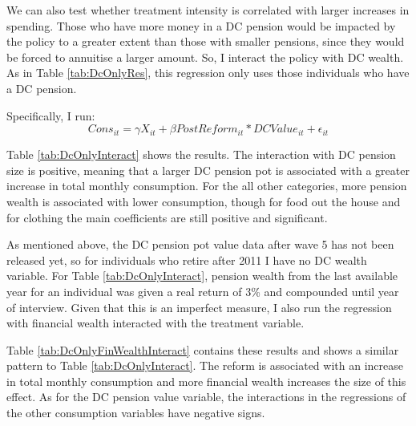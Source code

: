 \documentclass[12pt]{article}
\begin{document}
We can also test whether treatment intensity is correlated with larger increases
in spending. Those who have more money in a DC pension would be impacted by the
policy to a greater extent than those with smaller pensions, since they would be
forced to annuitise a larger amount. So, I interact the policy with DC wealth.
As in Table \ref{tab:DcOnlyRes}, this regression only uses those individuals who
have a DC pension.

Specifically, I run:
\begin{equation*}
    Cons_{it} =  \gamma X_{it} + \beta PostReform_{it}*DCValue_{it} + \epsilon_{it}
\end{equation*}

Table \ref{tab:DcOnlyInteract} shows the results. The interaction with DC
pension size is positive, meaning that a larger DC pension pot is associated with a
greater increase in total monthly consumption. For the all other categories,
more pension wealth is associated with lower consumption, though for food out
the house and for clothing the main coefficients are still positive and
significant.

As mentioned above, the DC pension pot value data after
wave 5 has not been released yet, so for individuals who retire after 2011 I
have no DC wealth variable. For Table \ref{tab:DcOnlyInteract}, pension wealth
from the last available year for an individual was given a real return of 3\%
and compounded until year of interview. Given that this is an imperfect measure,
I also run the regression with financial wealth interacted with the treatment
variable.

Table \ref{tab:DcOnlyFinWealthInteract} contains these results and shows a
similar pattern to Table \ref{tab:DcOnlyInteract}. The reform is associated with
an increase in total monthly consumption and more financial wealth increases the
size of this effect. As for the DC pension value variable, the interactions
in the regressions of the other consumption variables have negative signs.

\begin{landscape}
    \linespread{1}
    
\end{landscape}

\begin{landscape}
    \linespread{1}
    
\end{landscape}
\begin{landscape}
    \linespread{1}
    
\end{landscape}
\end{document}

